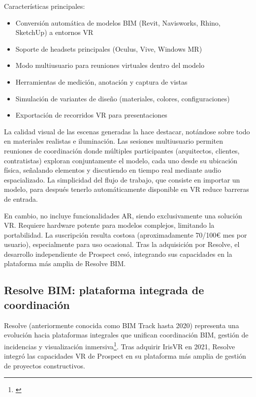 Características principales:
\begin{itemize}
\item Conversión automática de modelos BIM (Revit, Navisworks, Rhino, SketchUp) a entornos VR
\item Soporte de headsets principales (Oculus, Vive, Windows MR)
\item Modo multiusuario para reuniones virtuales dentro del modelo
\item Herramientas de medición, anotación y captura de vistas
\item Simulación de variantes de diseño (materiales, colores, configuraciones)
\item Exportación de recorridos VR para presentaciones
\end{itemize}
La calidad visual de las escenas generadas la hace destacar, notándose sobre todo en materiales realistas e iluminación. Las sesiones multiusuario permiten reuniones de coordinación donde múltiples participantes (arquitectos, clientes, contratistas) exploran conjuntamente el modelo, cada uno desde su ubicación física, señalando elementos y discutiendo en tiempo real mediante audio espacializado. La simplicidad del flujo de trabajo, que consiste en importar un modelo, para después tenerlo automáticamente disponible en VR reduce barreras de entrada.

En cambio, no incluye funcionalidades AR, siendo exclusivamente una solución VR. Requiere hardware potente para modelos complejos, limitando la portabilidad. La suscripción resulta costosa (aproximadamente 70/100€ mes por usuario), especialmente para uso ocasional. Tras la adquisición por Resolve, el desarrollo independiente de Prospect cesó, integrando sus capacidades en la plataforma más amplia de Resolve BIM.
\subsection{Resolve BIM: plataforma integrada de coordinación}

Resolve (anteriormente conocida como BIM Track hasta 2020) representa una evolución hacia plataformas integrales que unifican coordinación BIM, gestión de incidencias y visualización inmersiva\footnote{\cite{resolvebim}}. Tras adquirir IrisVR en 2021, Resolve integró las capacidades VR de Prospect en su plataforma más amplia de gestión de proyectos constructivos.

